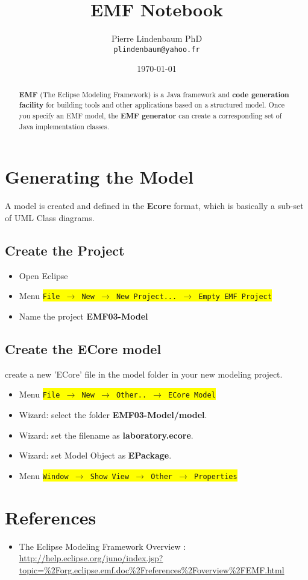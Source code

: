 \documentclass{article}
\date{\today}
\title{EMF Notebook}
\author{Pierre Lindenbaum PhD\\\texttt{plindenbaum@yahoo.fr}}
\newcommand{\menu}[1]{\colorbox{yellow}{\texttt{#1}}}
\def\emf{\textbf{EMF} }
\begin{document}
\maketitle

\begin{abstract}
\emf (The Eclipse Modeling Framework) is a Java framework and \textbf{code generation facility} for building tools and other applications based on a structured model.  Once you specify an EMF model, the \textbf{EMF generator} can create a corresponding set of Java implementation classes. 
\end{abstract}

\section{Generating the Model}
A model is created and defined in the \textbf{Ecore} format, which is basically a sub-set of UML Class diagrams.\\
\subsection{Create the Project}
\begin{itemize}
\item Open Eclipse
\item Menu \menu{File $\rightarrow$  New  $\rightarrow$ New Project... $\rightarrow$ Empty EMF Project}
\item Name the project \textbf{EMF03-Model}
\end{itemize}
\subsection{Create the ECore model}
create a new 'ECore' file in the model folder in your new modeling project.
\begin{itemize}
\item Menu \menu{File $\rightarrow$  New  $\rightarrow$ Other.. $\rightarrow$ ECore Model}
\item Wizard: select the folder \textbf{EMF03-Model/model}.
\item Wizard: set the filename as \textbf{laboratory.ecore}.
\item Wizard: set Model Object as  \textbf{EPackage}.
\item Menu \menu{Window  $\rightarrow$ Show View $\rightarrow$ Other $\rightarrow$ Properties}
\end{itemize}




\section{References}
\begin{itemize}
\item The Eclipse Modeling Framework Overview : \url{http://help.eclipse.org/juno/index.jsp?topic=%2Forg.eclipse.emf.doc%2Freferences%2Foverview%2FEMF.html}
\end{itemize}
\end{document}
